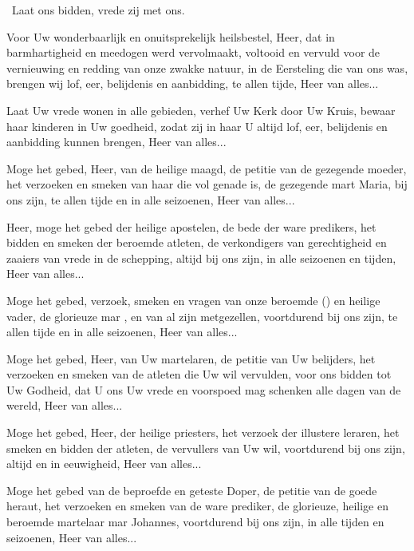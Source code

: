 \documentclass[12pt,twoside,a5paper]{article}
\begin{document}
\begin{halfparskip}
  \dd~Laat ons bidden, vrede zij met ons.

   Voor Uw wonderbaarlijk en onuitsprekelijk heilsbestel, Heer, dat in barmhartigheid en meedogen werd vervolmaakt, voltooid en vervuld voor de vernieuwing en redding van onze zwakke natuur, in de Eersteling die van ons was, brengen wij lof, eer, belijdenis en aanbidding, te allen tijde, Heer van alles...

   Laat Uw vrede wonen in alle gebieden, verhef Uw Kerk door Uw Kruis, bewaar haar kinderen in Uw goedheid, zodat zij in haar U altijd lof, eer, belijdenis en aanbidding kunnen brengen, Heer van alles...

   Moge het gebed, Heer, van de heilige maagd, de petitie van de gezegende moeder, het verzoeken en smeken van haar die vol genade is, de gezegende mart Maria, bij ons zijn, te allen tijde en in alle seizoenen, Heer van alles...

   Heer, moge het gebed der heilige apostelen, de bede der ware predikers, het bidden en smeken der beroemde atleten, de verkondigers van gerechtigheid en zaaiers van vrede in de schepping, altijd bij ons zijn, in alle seizoenen en tijden, Heer van alles...

   Moge het gebed, verzoek, smeken en vragen van onze beroemde () en heilige vader, de glorieuze mar \NN , en van al zijn metgezellen, voortdurend bij ons zijn, te allen tijde en in alle seizoenen, Heer van alles...

   Moge het gebed, Heer, van Uw martelaren, de petitie van Uw belijders, het verzoeken en smeken van de atleten die Uw wil vervulden, voor ons bidden tot Uw Godheid, dat U ons Uw vrede en voorspoed mag schenken alle dagen van de wereld, Heer van alles...

   Moge het gebed, Heer, der heilige priesters, het verzoek der illustere leraren, het smeken en bidden der atleten, de vervullers van Uw wil, voortdurend bij ons zijn, altijd en in eeuwigheid, Heer van alles...

   Moge het gebed van de beproefde en geteste Doper, de petitie van de goede heraut, het verzoeken en smeken van de ware prediker, de glorieuze, heilige en beroemde martelaar mar Johannes, voortdurend bij ons zijn, in alle tijden en seizoenen, Heer van alles...
\end{halfparskip}
\end{document}
